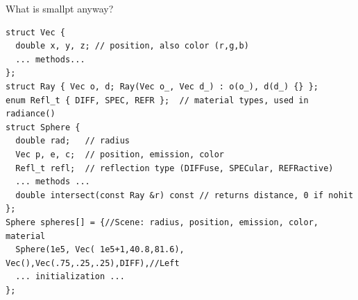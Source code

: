 \documentclass[8pt]{beamer}
\begin{document}
\begin{frame}[fragile]{What is smallpt anyway?}
\begin{verbatim}
struct Vec {      
  double x, y, z; // position, also color (r,g,b) 
  ... methods...
}; 
struct Ray { Vec o, d; Ray(Vec o_, Vec d_) : o(o_), d(d_) {} }; 
enum Refl_t { DIFF, SPEC, REFR };  // material types, used in radiance() 
struct Sphere { 
  double rad;   // radius 
  Vec p, e, c;  // position, emission, color 
  Refl_t refl;  // reflection type (DIFFuse, SPECular, REFRactive) 
  ... methods ...
  double intersect(const Ray &r) const // returns distance, 0 if nohit 
}; 
Sphere spheres[] = {//Scene: radius, position, emission, color, material 
  Sphere(1e5, Vec( 1e5+1,40.8,81.6), Vec(),Vec(.75,.25,.25),DIFF),//Left 
  ... initialization ...
}; 
\end{verbatim}
\end{frame}
\end{document}
